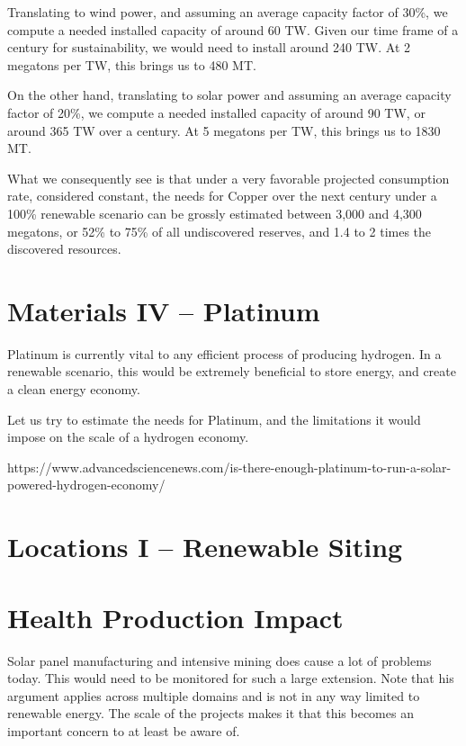 Translating to wind power, and assuming an average capacity factor of 30\%, we compute a needed installed capacity of around 60 TW. Given our time frame of a century for sustainability, we would need to install around 240 TW. At 2 megatons per TW, this brings us to 480 MT.

On the other hand, translating to solar power and assuming an average capacity factor of 20\%, we compute a needed installed capacity of around 
90 TW, or around 365 TW over a century. At 5 megatons per TW, this brings us to 1830 MT.

What we consequently see is that under a very favorable projected consumption rate, considered constant, the needs for Copper over the next century under a 100\% renewable scenario can be grossly estimated between 3,000 and 4,300 megatons, or 52\% to 75\% of all undiscovered reserves, and 1.4 to 2 times the discovered resources.

\section{Materials IV -- Platinum}

Platinum is currently vital to any efficient process of producing hydrogen. In a renewable scenario, this would be extremely beneficial to store energy, and create a clean energy economy.

Let us try to estimate the needs for Platinum, and the limitations it would impose on the scale of a hydrogen economy.

https://www.advancedsciencenews.com/is-there-enough-platinum-to-run-a-solar-powered-hydrogen-economy/

\section{Locations I -- Renewable Siting}

\blindtext

\section{Health Production Impact}

Solar panel manufacturing and intensive mining does cause a lot of problems today. This would need to be monitored for such a large extension. Note that his argument applies across multiple domains and is not in any way limited to renewable energy. The scale of the projects makes it that this becomes an important concern to at least be aware of.

